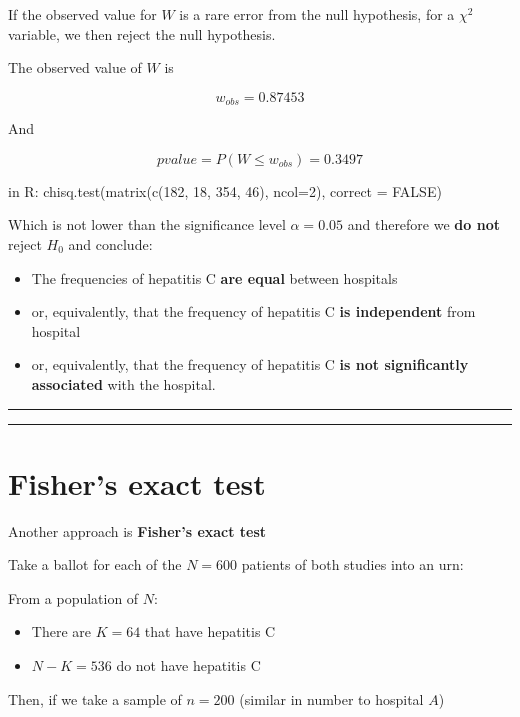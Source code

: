 \documentclass[
]{book}
\providecommand{\tightlist}{%
  \setlength{\itemsep}{0pt}\setlength{\parskip}{0pt}}
\begin{document}
If the observed value for \(W\) is a rare error from the null hypothesis, for a \(\chi^2\) variable, we then reject the null hypothesis.

The observed value of \(W\) is

\[w_{obs}= 0.87453\]

And

\[pvalue=P(W \leq w_{obs}) =0.3497\]

in R: chisq.test(matrix(c(182, 18, 354, 46), ncol=2), correct = FALSE)

Which is not lower than the significance level \(\alpha=0.05\) and therefore we \textbf{do not} reject \(H_0\) and conclude:

\begin{itemize}
\item
  The frequencies of hepatitis C \textbf{are equal} between hospitals
\item
  or, equivalently, that the frequency of hepatitis C \textbf{is independent} from hospital
\item
  or, equivalently, that the frequency of hepatitis C \textbf{is not significantly associated} with the hospital.
\end{itemize}

\begin{center}\rule{0.5\linewidth}{0.5pt}\end{center}

\begin{center}\rule{0.5\linewidth}{0.5pt}\end{center}

\hypertarget{fishers-exact-test}{%
\section{Fisher's exact test}\label{fishers-exact-test}}

Another approach is \textbf{Fisher's exact test}

Take a ballot for each of the \(N=600\) patients of both studies into an urn:

From a population of \(N\):

\begin{itemize}
\tightlist
\item
  There are \(K=64\) that have hepatitis C
\item
  \(N-K=536\) do not have hepatitis C
\end{itemize}

Then, if we take a sample of \(n=200\) (similar in number to hospital \(A\))
\end{document}

